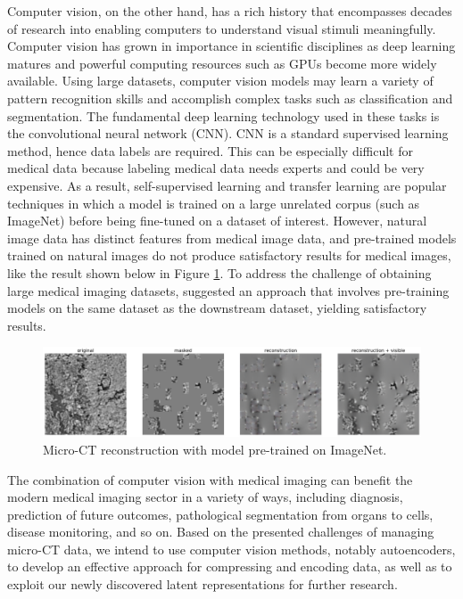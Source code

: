 \documentclass[11pt,titlepage,openright]{book}
\begin{document}
Computer vision, on the other hand, has a rich history that encompasses decades of research into enabling computers to understand visual stimuli meaningfully. Computer vision has grown in importance in scientific disciplines as deep learning matures and powerful computing resources such as GPUs become more widely available. Using large datasets, computer vision models may learn a variety of pattern recognition skills and accomplish complex tasks such as classification and segmentation. The fundamental deep learning technology used in these tasks is the convolutional neural network (CNN). CNN is a standard supervised learning method, hence data labels are required. This can be especially difficult for medical data because labeling medical data needs experts and could be very expensive. As a result, self-supervised learning and transfer learning are popular techniques in which a model is trained on a large unrelated corpus (such as ImageNet) before being fine-tuned on a dataset of interest. However, natural image data has distinct features from medical image data, and pre-trained models trained on natural images do not produce satisfactory results for medical images, like the result shown below in Figure \ref{fig:ImageNet}. To address the challenge of obtaining large medical imaging datasets, \cite{zhou2023self} suggested an approach that involves pre-training models on the same dataset as the downstream dataset, yielding satisfactory results.

\begin{figure}[t]
  \centering
  \vspace*{1em}
  \includegraphics[width=0.9\linewidth]{Figures/Imagenet_example.png}
  \vspace*{1em}
  \caption{Micro-CT reconstruction with model pre-trained on ImageNet.}
  \label{fig:ImageNet}
\end{figure}

The combination of computer vision with medical imaging can benefit the modern medical imaging sector in a variety of ways, including diagnosis, prediction of future outcomes, pathological segmentation from organs to cells, disease monitoring, and so on. Based on the presented challenges of managing micro-CT data, we intend to use computer vision methods, notably autoencoders, to develop an effective approach for compressing and encoding data, as well as to exploit our newly discovered latent representations for further research.
\end{document}
